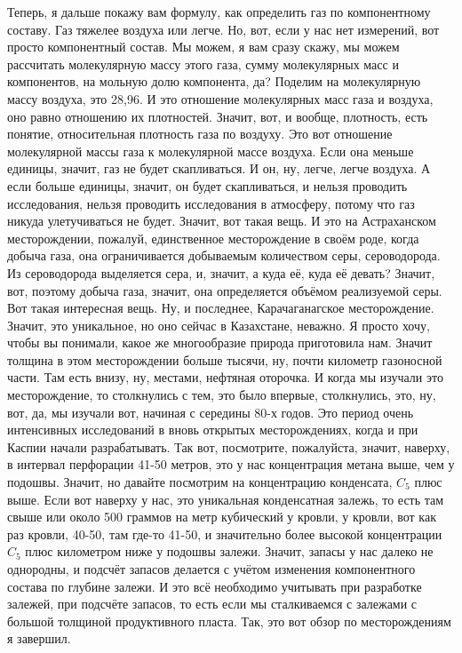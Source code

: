 \documentclass[main.tex]{subfiles}
\begin{document}
Теперь, я дальше покажу вам формулу, как определить газ по компонентному составу.
Газ тяжелее воздуха или легче.
Но, вот, если у нас нет измерений, вот просто компонентный состав.
Мы можем, я вам сразу скажу, мы можем рассчитать молекулярную массу этого газа, сумму молекулярных масс и компонентов, на мольную долю компонента, да?
Поделим на молекулярную массу воздуха, это 28,96.
И это отношение молекулярных масс газа и воздуха, оно равно отношению их плотностей.
Значит, вот, и вообще, плотность, есть понятие, относительная плотность газа по воздуху.
Это вот отношение молекулярной массы газа к молекулярной массе воздуха.
Если она меньше единицы, значит, газ не будет скапливаться.
И он, ну, легче, легче воздуха.
А если больше единицы, значит, он будет скапливаться, и нельзя проводить исследования, нельзя проводить исследования в атмосферу, потому что газ никуда улетучиваться не будет.
Значит, вот такая вещь.
И это на Астраханском месторождении, пожалуй, единственное месторождение в своём роде, когда добыча газа, она ограничивается добываемым количеством серы, сероводорода.
Из сероводорода выделяется сера, и, значит, а куда её, куда её девать?
Значит, вот, поэтому добыча газа, значит, она определяется объёмом реализуемой серы.
Вот такая интересная вещь.
Ну, и последнее, Карачаганагское месторождение.
Значит, это уникальное, но оно сейчас в Казахстане, неважно.
Я просто хочу, чтобы вы понимали, какое же многообразие природа приготовила нам.
Значит толщина в этом месторождении больше тысячи, ну, почти километр газоносной части.
Там есть внизу, ну, местами, нефтяная оторочка.
И когда мы изучали это месторождение, то столкнулись с тем, это было впервые, столкнулись, это, ну, вот, да, мы изучали вот, начиная с середины 80-х годов.
Это период очень интенсивных исследований в вновь открытых месторождениях, когда и при Каспии начали разрабатывать.
Так вот, посмотрите, пожалуйста, значит, наверху, в интервал перфорации 41-50 метров, это у нас концентрация метана выше, чем у подошвы.
Значит, но давайте посмотрим на концентрацию конденсата, $C_5$ плюс выше.
Если вот наверху у нас, это уникальная конденсатная залежь, то есть там свыше или около 500 граммов на метр кубический у кровли, у кровли, вот как раз кровли, 40-50, там где-то 41-50, и значительно более высокой концентрации $C_5$ плюс километром ниже у подошвы залежи.
Значит, запасы у нас далеко не однородны, и подсчёт запасов делается с учётом изменения компонентного состава по глубине залежи.
И это всё необходимо учитывать при разработке залежей, при подсчёте запасов, то есть если мы сталкиваемся с залежами с большой толщиной продуктивного пласта.
Так, это вот обзор по месторождениям я завершил.
\end{document}
